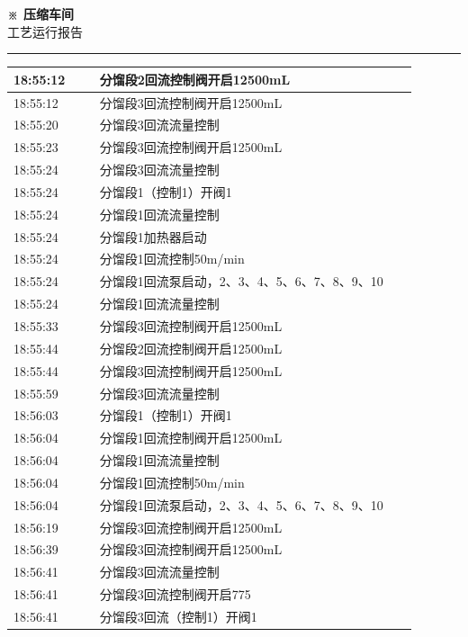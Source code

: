 \documentclass[UTF8,10pt,a4paper,fontset=fandol]{ctexart}
\begin{document}
\vspace{4mm}

\begin{center}
\begin{minipage}[t]{0.47\linewidth}
\centering
\textbf{※ 压缩车间}\\[-1mm]
工艺运行报告

\vspace{1mm}
\hrule
\vspace{1mm}

\scriptsize
\begin{tabular}{|p{0.19\linewidth}|p{0.70\linewidth}|}
\hline
18:55:12 & 分馏段2回流控制阀开启12500mL \\ \hline
18:55:12 & 分馏段3回流控制阀开启12500mL \\ \hline
18:55:20 & 分馏段3回流流量控制 \\ \hline
18:55:23 & 分馏段3回流控制阀开启12500mL \\ \hline
18:55:24 & 分馏段3回流流量控制 \\ \hline
18:55:24 & 分馏段1（控制1）开阀1 \\ \hline
18:55:24 & 分馏段1回流流量控制 \\ \hline
18:55:24 & 分馏段1加热器启动 \\ \hline
18:55:24 & 分馏段1回流控制50m/min \\ \hline
18:55:24 & 分馏段1回流泵启动，2、3、4、5、6、7、8、9、10 \\ \hline
18:55:24 & 分馏段1回流流量控制 \\ \hline
18:55:33 & 分馏段3回流控制阀开启12500mL \\ \hline
18:55:44 & 分馏段2回流控制阀开启12500mL \\ \hline
18:55:44 & 分馏段3回流控制阀开启12500mL \\ \hline
18:55:59 & 分馏段3回流流量控制 \\ \hline
18:56:03 & 分馏段1（控制1）开阀1 \\ \hline
18:56:04 & 分馏段1回流控制阀开启12500mL \\ \hline
18:56:04 & 分馏段1回流流量控制 \\ \hline
18:56:04 & 分馏段1回流控制50m/min \\ \hline
18:56:04 & 分馏段1回流泵启动，2、3、4、5、6、7、8、9、10 \\ \hline
18:56:19 & 分馏段3回流控制阀开启12500mL \\ \hline
18:56:39 & 分馏段3回流控制阀开启12500mL \\ \hline
18:56:41 & 分馏段3回流流量控制 \\ \hline
18:56:41 & 分馏段3回流控制阀开启775 \\ \hline
18:56:41 & 分馏段3回流（控制1）开阀1 \\ \hline
\end{tabular}


\end{minipage}
\end{center}
\end{document}

